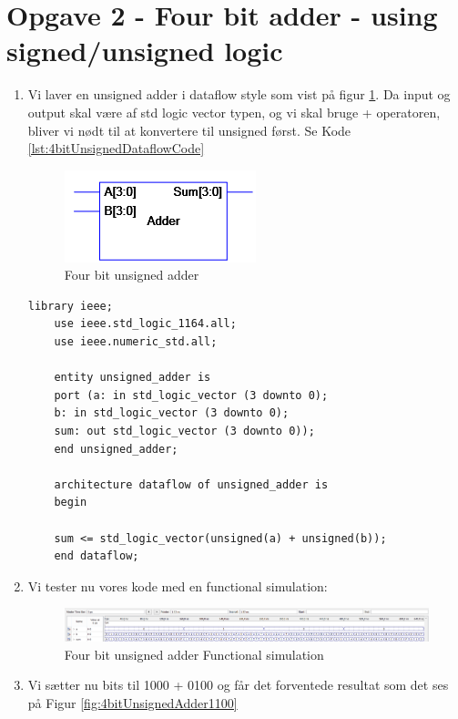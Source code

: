 \newpage
\section{Opgave 2 - Four bit adder - using signed/unsigned logic}

\begin{enumerate}
	\item[1)]
	Vi laver en unsigned adder i dataflow style som vist på figur \ref{fig:4bitUnsignedAdder}. Da input og output skal være af std logic vector typen, og vi skal bruge + operatoren, bliver vi nødt til at konvertere til unsigned først. Se Kode \ref{lst:4bitUnsignedDataflowCode}\\
	
	\begin{figure}[H]
		\centering
		\includegraphics[scale=0.5]{pictures/Oevelse3/4bit_unsigned_adder.jpg}
		\caption{Four bit unsigned adder}
		\label{fig:4bitUnsignedAdder}
	\end{figure}
	
	\begin{lstlisting}[caption={Four bit unsigned adder Dataflow VHDL kode},label={lst:4bitUnsignedDataflowCode}]
	library ieee;
	use ieee.std_logic_1164.all;
	use ieee.numeric_std.all;
	
	entity unsigned_adder is
	port (a: in std_logic_vector (3 downto 0);
	b: in std_logic_vector (3 downto 0);
	sum: out std_logic_vector (3 downto 0));
	end unsigned_adder;
	
	architecture dataflow of unsigned_adder is
	begin
	
	sum <= std_logic_vector(unsigned(a) + unsigned(b));
	end dataflow;
	\end{lstlisting}
	
	\item[2)]
	Vi tester nu vores kode med en functional simulation:\\
	\begin{figure}[H]	
		\centering
		\includegraphics[scale=0.4]{pictures/Oevelse3/4bit_unsigned_adder_functional_simulation.jpeg}
		\caption{Four bit unsigned adder Functional simulation}
		\label{fig:4bitUnsignedAdderFuncSim}
	\end{figure}
\newpage
	\item[3)]
	Vi sætter nu bits til 1000 + 0100 og får det forventede resultat som det ses på Figur \ref{fig:4bitUnsignedAdder1100}\\
	\begin{figure}[H]
		

\end{figure}
\end{enumerate}
